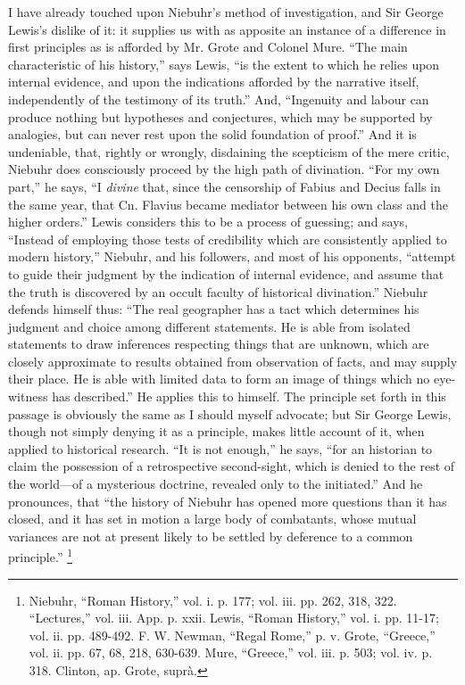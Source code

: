I have already touched upon Niebuhr's method of investigation, and
Sir George Lewis's dislike of it: it supplies us with as apposite an
instance of a difference in first principles as is afforded by Mr.
Grote and Colonel Mure. ``The main characteristic of his
history,'' says Lewis, ``is the extent to which he relies upon
internal evidence, and upon the indications afforded by the narrative
itself, independently of the testimony of its truth.'' And,
``Ingenuity and labour can produce nothing but hypotheses
and conjectures, which may be supported by analogies, but can never
rest upon the solid foundation of proof.'' And it is undeniable,
that, rightly or wrongly, disdaining the scepticism of the mere
critic, Niebuhr does consciously proceed by the high path of
divination. ``For my own part,'' he says, ``I \emph{divine} that,
since the censorship of Fabius and Decius falls in the same year, that
Cn. Flavius became mediator between his own class and the higher
orders.'' Lewis considers this to be a process of guessing; and
says, ``Instead of employing those tests of credibility which are
consistently applied to modern history,'' Niebuhr, and his
followers, and most of his opponents, ``attempt to guide their
judgment by the indication of internal evidence, and assume that the
truth is discovered by an occult faculty of historical
divination.'' Niebuhr defends himself thus: ``The real
geographer has a tact which determines his judgment and choice among
different statements. He is able from isolated statements to draw
inferences respecting things that are unknown, which are closely
approximate to results obtained from observation of facts, and may
supply their place. He is able with limited data to form an image of
things which no eye-witness has described.'' He applies this to
himself. The principle set forth in this passage is obviously the same
as I should myself advocate; but Sir George Lewis, though not simply
denying it as a principle, makes little account of it, when applied to
historical research. ``It is not enough,'' he says, ``for
an historian to claim the possession of a retrospective second-sight,
which is denied to the rest of the world—of a mysterious
doctrine, revealed only to the initiated.'' And he pronounces,
that ``the history of Niebuhr has opened more questions than it
has closed, and it has set in motion a large body of combatants, whose
mutual variances are not at present likely to be settled by deference
to a common principle.'' \footnote{Niebuhr,
``Roman History,'' vol. i. p. 177; vol. iii. pp. 262, 318,
322. ``Lectures,'' vol. iii. App. p. xxii. Lewis, ``Roman
History,'' vol. i. pp. 11-17; vol. ii. pp. 489-492. F. W. Newman,
``Regal Rome,'' p. v. Grote, ``Greece,'' vol. ii. pp.
67, 68, 218, 630-639. Mure, ``Greece,'' vol. iii. p. 503; vol.
iv. p. 318. Clinton, ap. Grote, suprà.}

